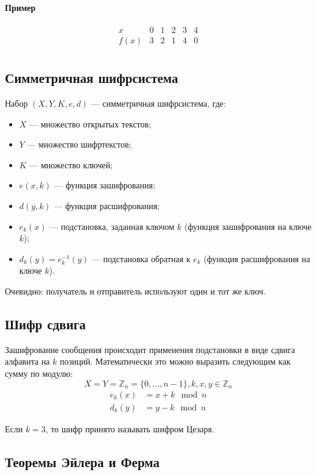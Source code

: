 \documentclass[a4paper,12pt]{article}
\begin{document}
\paragraph{Пример}
$$
\begin{matrix}
	x & 0 & 1 & 2 & 3 & 4 \\
	f(x) & 3 & 2 & 1 & 4 & 0 \\
\end{matrix}
$$

\subsection{Симметричная шифрсистема}

Набор $(X,Y,K,e,d)$ --- симметричная шифрсистема, где:
\begin{itemize}
	\item $X$ --- множество открытых текстов;
	\item $Y$ --- множество шифртекстов;
	\item $K$ --- множество ключей;
	\item $e(x, k)$ --- функция зашифрования;
	\item $d(y, k)$ --- функция расшифрования;
	\item $e_k(x)$ --- подстановка, заданная ключом $k$ (функция зашифрования на ключе $k$);
	\item $d_k(y) = e_k^{-1}(y)$ --- подстановка обратная к $e_k$ (функция расшифрования на ключе $k$).
\end{itemize}

Очевидно: получатель и отправитель используют один и тот же ключ.

\subsection{Шифр сдвига}

Зашифрование сообщения происходит применения подстановки в виде сдвига алфавита на $k$ позиций. Математически это можно выразить следующим как сумму по модулю:
$$X = Y = \mathbb{Z}_n = \{0, ..., n-1\}, k,x,y \in \mathbb{Z}_n
$$
$$
\begin{aligned}
	e_k(x) &= x + k \mod n \\
	d_k(y) &= y - k \mod n
\end{aligned}
$$

Если $k = 3$, то шифр принято называть шифром Цезаря.

\subsection{Теоремы Эйлера и Ферма}
\end{document}
